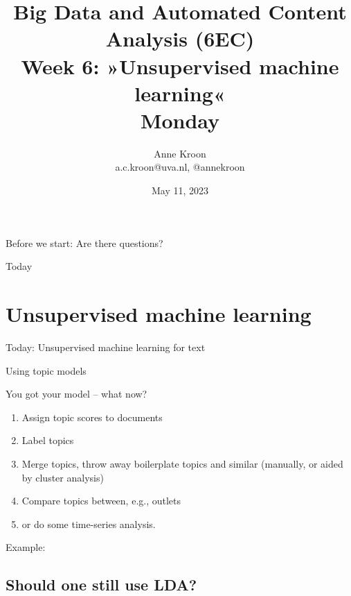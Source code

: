 \documentclass[compress]{beamer}
\begin{document}
\title[Big Data and Automated Content Analysis]{\textbf{Big Data and Automated Content Analysis (6EC)} 
\\Week 6: »Unsupervised machine learning«
\\Monday}
\author[Anne Kroon]{Anne Kroon\\ \footnotesize{a.c.kroon@uva.nl, @annekroon \\}}
\date{May 11, 2023}


\begin{frame}{}
	\titlepage
\end{frame}

\begin{frame}[standout]
Before we start: Are there questions?
\end{frame}


\begin{frame}{Today}
	\tableofcontents
\end{frame}

\section{Unsupervised machine learning}

\begin{frame}[standout]
Today: Unsupervised machine learning for text
\end{frame}

\begin{frame}{Using topic models}

	You got your model -- what now?
	
	\begin{enumerate}
	\item Assign topic scores to documents
	\item Label topics
	\item Merge topics, throw away boilerplate topics and similar (manually, or aided by cluster analysis)
	\item Compare topics between, e.g., outlets
	\item or do some time-series analysis.
	\end{enumerate}
	
	
	Example: \cite{Tsur2015}
	
	\end{frame}
	
	
	
	\subsection{Should one still use LDA?}
	
\end{document}
